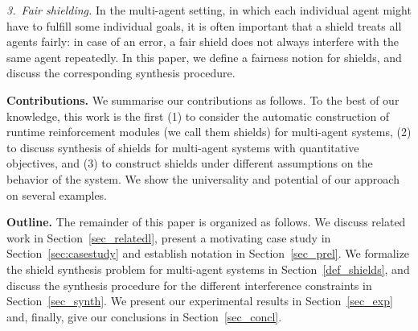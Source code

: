 \emph{3.\ Fair shielding.}
In the multi-agent setting, in which each individual agent might have to fulfill some individual goals, it is often important that a shield treats all agents fairly:
in case of an error, a fair shield does not always interfere with the same agent repeatedly.
In this paper, we define a fairness notion for shields, and discuss the corresponding synthesis procedure.

\textbf{Contributions.}  We summarise our contributions as follows. To the best of our knowledge, this work is the first (1) to consider the automatic construction of runtime reinforcement modules
(we call them shields) for multi-agent systems, (2) to discuss synthesis of shields for multi-agent systems with quantitative objectives,
and (3) to construct shields under different assumptions on the behavior of the system.
We show the universality and potential of our approach on several examples.

\textbf{Outline.} The remainder of this paper is organized as follows. We discuss related work in Section~\ref{sec_relatedl}, present a motivating case study in Section~\ref{sec:casestudy}
and  establish notation in Section~\ref{sec_prel}. We formalize the shield synthesis problem for multi-agent systems in
Section~\ref{def_shields}, and discuss the synthesis procedure for the different interference constraints in
Section~\ref{sec_synth}. We present our experimental results
in Section~\ref{sec_exp} and, finally, give our conclusions in Section~\ref{sec_concl}.


